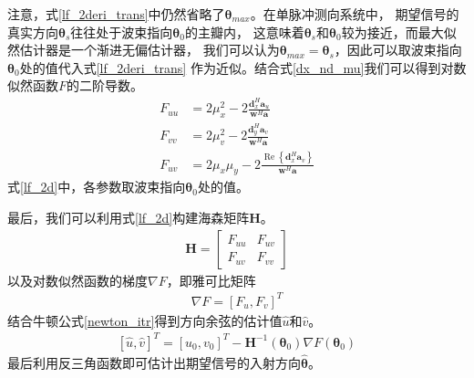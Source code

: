 \documentclass[master]{thesis-uestc}
\begin{document}
注意，式\eqref{lf_2deri_trans}中仍然省略了$\bm{\theta}_{max}$。在单脉冲测向系统中，
期望信号的真实方向$\bm{\theta}_s$往往处于波束指向$\bm{\theta}_0$的主瓣内，
这意味着$\bm{\theta}_s$和$\bm{\theta}_0$较为接近，而最大似然估计器是一个渐进无偏估计器，
我们可以认为$\bm{\theta}_{max}=\bm{\theta}_s$，因此可以取波束指向$\bm{\theta}_0$处的值代入式\eqref{lf_2deri_trans}
作为近似。结合式\eqref{dx_nd_mu}我们可以得到对数似然函数$F$的二阶导数。
\begin{subequations}\label{lf_2d}
    \begin{align}
        F_{uu} &= 2\mu^2_x - 2\frac{\bm{d}^H_x\bm{a}_u}{\bm{w}^H\bm{a}} \\
        F_{vv} &= 2\mu^2_v - 2\frac{\bm{d}^H_y\bm{a}_v}{\bm{w}^H\bm{a}} \\
        F_{uv} &= 2\mu_x\mu_y - 2\frac{\operatorname{Re}\left\{\bm{d}^H_x\bm{a}_v\right\}}{\bm{w}^H\bm{a}}
    \end{align}
\end{subequations}
式\eqref{lf_2d}中，各参数取波束指向$\bm{\theta}_0$处的值。

最后，我们可以利用式\eqref{lf_2d}构建海森矩阵$\bm{H}$。
\begin{equation}\label{hessian_mat}
    \begin{aligned}
        \bm{H} = 
        \begin{bmatrix}
            F_{uu} & F_{uv} \\
            F_{uv} & F_{vv}
        \end{bmatrix}
    \end{aligned}
\end{equation}
以及对数似然函数的梯度$\nabla F$，即雅可比矩阵
\begin{equation}\label{jacobian_mat}
    \begin{aligned}
        \nabla F = \left[F_{u},F_{v}\right]^T
    \end{aligned}
\end{equation}
结合牛顿公式\eqref{newton_itr}得到方向余弦的估计值$\hat{u}$和$\hat{v}$。
\begin{equation}
    \begin{aligned}
        \left[\hat{u},\hat{v}\right]^T = \left[u_0, v_0\right]^T - \bm{H}^{-1}(\bm{\theta}_0)\nabla F(\bm{\theta}_0)
    \end{aligned}
\end{equation}
最后利用反三角函数即可估计出期望信号的入射方向$\hat{\bm{\theta}}$。
\end{document}
